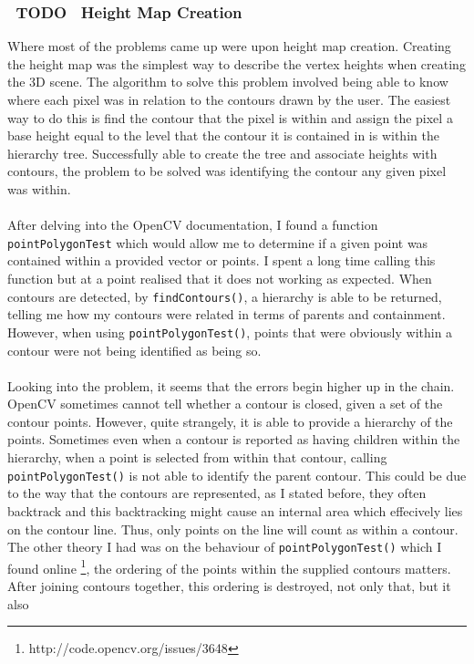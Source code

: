 \documentclass[11pt]{article}
\begin{document}
\subsubsection{~TODO~ Height Map Creation}
Where most of the problems came up were upon height map creation. 
Creating the height map was the simplest way to 
describe the vertex heights when creating the 3D scene. The algorithm to
solve this problem involved being able to know where each pixel was in 
relation to the contours drawn by the user. The easiest way to do this is
find the contour that the pixel is within and assign the pixel a base
height equal to the level that the contour it is contained in is within
the hierarchy tree. Successfully able to create the tree and 
associate heights with contours, the problem to be solved was
identifying the contour any given pixel was within.\\
\\
After delving into the OpenCV documentation, I found a function
\texttt{pointPolygonTest} which would allow me to determine if a given
point was contained within a provided vector or points. 
I spent a long time calling this function 
but at a point realised that it does not working as expected.
When contours are detected, by \texttt{findContours()}, a hierarchy
is able to be returned, telling me how my contours were related in terms
of parents and containment. However, when using \texttt{pointPolygonTest()},
points that were obviously within a contour were not being identified
as being so. \\
\\
Looking into the problem, it seems that the errors begin higher up in the 
chain. OpenCV sometimes cannot tell whether a contour is closed, given a
set of the contour points. However, quite strangely, it is able to provide
a hierarchy of the points. Sometimes even when a contour is reported
as having children within the hierarchy, when a point is selected from within
that contour, calling \texttt{pointPolygonTest()} is not able to identify
the parent contour. This could be due to the way that the contours are
represented, as I stated before, they often backtrack and this backtracking
might cause an internal area which effecively lies on the contour line. Thus,
only points on the line will count as within a contour. The other theory
I had was on the behaviour of \texttt{pointPolygonTest()} which I found
online \footnote{http://code.opencv.org/issues/3648}, 
the ordering of the points within the supplied contours matters. After joining
contours together, this ordering is destroyed, not only that, but it also
\end{document}
